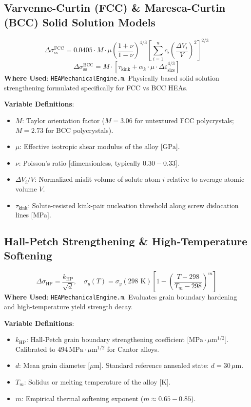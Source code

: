 \documentclass[11pt,a4paper]{article}
\begin{document}
\subsection{Varvenne-Curtin (FCC) & Maresca-Curtin (BCC) Solid Solution Models}
\begin{equation}
\Delta\sigma_{\text{ss}}^{\text{FCC}} = 0.0405 \cdot M \cdot \mu \left(\frac{1 + \nu}{1 - \nu}\right)^{4/3} \left[ \sum_{i=1}^n c_i \left(\frac{\Delta V_i}{V}\right)^2 \right]^{2/3}
\end{equation}
\begin{equation}
\Delta\sigma_{\text{ss}}^{\text{BCC}} = M \cdot \left[ \tau_{\text{kink}} + \alpha_k \cdot \mu \cdot \Delta\varepsilon_{\text{size}}^{4/3} \right]
\end{equation}
\textbf{Where Used}: \texttt{HEAMechanicalEngine.m}. Physically based solid solution strengthening formulated specifically for FCC vs BCC HEAs.

\noindent\textbf{Variable Definitions}:
\begin{itemize}
  \item $M$: Taylor orientation factor ($M = 3.06$ for untextured FCC polycrystals; $M = 2.73$ for BCC polycrystals).
  \item $\mu$: Effective isotropic shear modulus of the alloy [$\text{GPa}$].
  \item $\nu$: Poisson's ratio [dimensionless, typically $0.30 - 0.33$].
  \item $\Delta V_i / V$: Normalized misfit volume of solute atom $i$ relative to average atomic volume $V$.
  \item $\tau_{\text{kink}}$: Solute-resisted kink-pair nucleation threshold along screw dislocation lines [$\text{MPa}$].
\end{itemize}

\subsection{Hall-Petch Strengthening \& High-Temperature Softening}
\begin{equation}
\Delta\sigma_{\text{HP}} = \frac{k_{\text{HP}}}{\sqrt{d}}, \quad \sigma_y(T) = \sigma_y(298\text{ K}) \left[ 1 - \left(\frac{T - 298}{T_m - 298}\right)^m \right]
\end{equation}
\textbf{Where Used}: \texttt{HEAMechanicalEngine.m}. Evaluates grain boundary hardening and high-temperature yield strength decay.

\noindent\textbf{Variable Definitions}:
\begin{itemize}
  \item $k_{\text{HP}}$: Hall-Petch grain boundary strengthening coefficient [$\text{MPa}\cdot\mu\text{m}^{1/2}$]. Calibrated to $494 \, \text{MPa}\cdot\mu\text{m}^{1/2}$ for Cantor alloys.
  \item $d$: Mean grain diameter [$\mu\text{m}$]. Standard reference annealed state: $d = 30 \, \mu\text{m}$.
  \item $T_m$: Solidus or melting temperature of the alloy [$\text{K}$].
  \item $m$: Empirical thermal softening exponent ($m \approx 0.65 - 0.85$).
\end{itemize}
\end{document}
